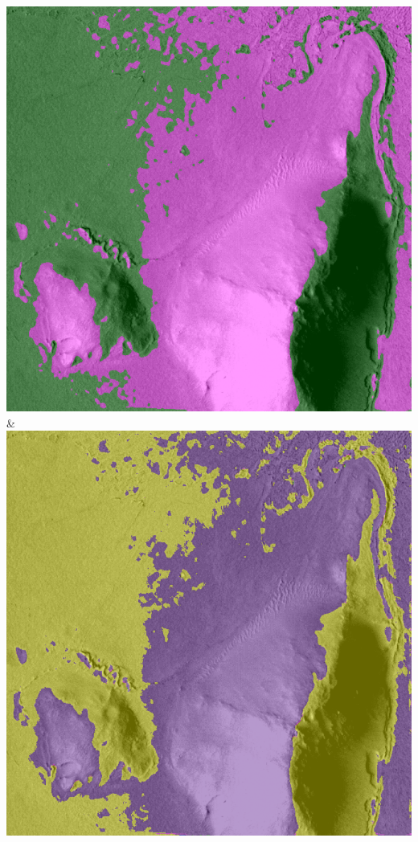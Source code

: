 \begin{table}[h!]
\begin{tabularx}{\textwidth}
		\includegraphics[width=0.9\linewidth]{images/gen/activation_functions/p03_04.png_sigmoid.png} &
		\includegraphics[width=0.9\linewidth]{images/gen/activation_functions/p03_04.png_tanh.png} \\
		\bottomrule
	\end{tabularx}
	\caption{Vergleich der Auswirkungen der Nutzung verschiedener Aktivierungsfunktionen. Die Farben der jeweilgen Cluster wurden zufällig gewählt.\\
		Hinweis: In der dritten Aufnahme von oben ist das helle Segment in der Mitte mit dem gleichen Label markiert wie der jeweils rechte Rand. Durch die Darstellung ist dies nicht eindeutig zu erkennen.}
	\label{tab:activation_comparision}
\end{table}

